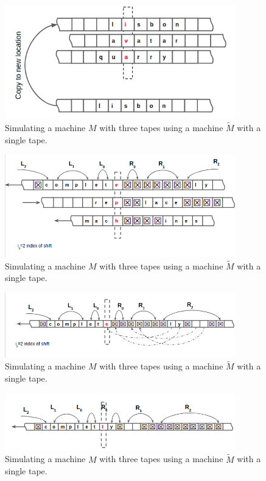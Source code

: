 \documentclass[a4paper,12pt]{article}
\begin{document}
\begin{figure}[!ht]
\centering
\includegraphics[width=10cm]{ex4.png}
\caption{Simulating a machine $M$ with three tapes using a machine $\widetilde{M}$ with a single tape.}
\label{fig:scetch2}
\end{figure}

\begin{figure}[!ht]
\centering
\includegraphics[width=10cm]{al1.png}
\caption{Simulating a machine $M$ with three tapes using a machine $\widetilde{M}$ with a single tape.}
\label{fig:scetch2}
\end{figure}

\begin{figure}[!ht]
\centering
\includegraphics[width=10cm]{al2.png}
\caption{Simulating a machine $M$ with three tapes using a machine $\widetilde{M}$ with a single tape.}
\label{fig:scetch2}
\end{figure}

\begin{figure}[!ht]
\centering
\includegraphics[width=10cm]{al3.png}
\caption{Simulating a machine $M$ with three tapes using a machine $\widetilde{M}$ with a single tape.}
\label{fig:scetch2}
\end{figure}
\end{document}
